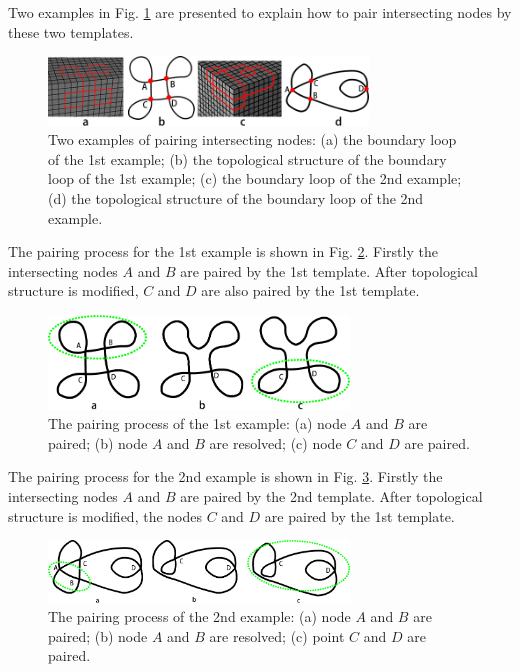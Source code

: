 \documentclass[final,5p,times,twocolumn]{elsarticle}
\begin{document}
Two examples in Fig. \ref{fig:pair_int_exams} are presented to explain how to pair intersecting nodes by these two templates.

\begin{figure}[htbp]
\begin{center}
\includegraphics[width=8.5cm]{figures/pmatchexams.png}
\caption{Two examples of pairing intersecting nodes: (a) the boundary loop of the 1st example; (b) the topological structure of the boundary loop of the 1st example; (c) the boundary loop of the 2nd example; (d) the topological structure of the boundary loop of the 2nd example.}
\label{fig:pair_int_exams}
\end{center}
\end{figure}

The pairing process for the 1st example is shown in Fig. \ref{fig:pair_int_exam1_proc}. Firstly the intersecting nodes $A$ and $B$ are paired by the 1st template. After topological structure is modified, $C$ and $D$ are also paired by the 1st template.

\begin{figure}[htbp]
\begin{center}
\includegraphics[width=8cm]{figures/pmexam1step.png}
\caption{The pairing process of the 1st example: (a) node $A$ and $B$ are paired; (b) node $A$ and $B$ are resolved; (c) node $C$ and $D$ are paired.}
\label{fig:pair_int_exam1_proc}
\end{center}
\end{figure}

The pairing process for the 2nd example is shown in Fig. \ref{fig:pair_int_exam2_proc}. Firstly the intersecting nodes $A$ and $B$ are paired by the 2nd template. After topological structure is modified, the nodes $C$ and $D$ are paired by the 1st template.

\begin{figure}[htbp]
\begin{center}
\includegraphics[width=8cm]{figures/pmexam2step.png}
\caption{The pairing process of the 2nd example: (a) node $A$ and $B$ are paired; (b) node $A$ and $B$ are resolved; (c) point $C$ and $D$ are paired.}
\label{fig:pair_int_exam2_proc}
\end{center}
\end{figure}
\end{document}

